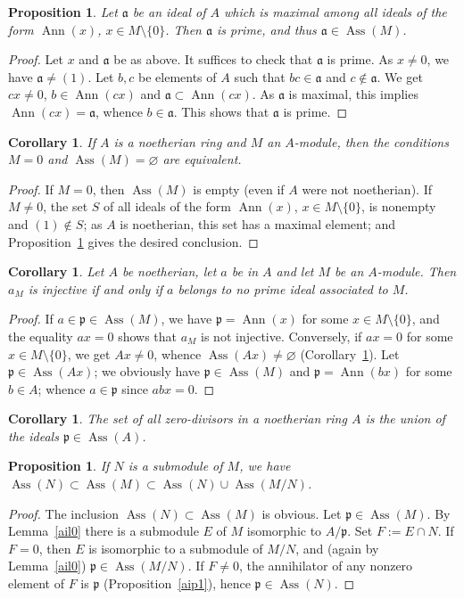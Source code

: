 \documentclass[12pt,letterpaper]{article}%
\newcommand{\oo}{\operatorname}\newcommand{\ooo}{\operatorname*}
\newcommand{\mf}{\mathfrak}
\newcommand{\aaa}{\mf a}
\newcommand{\ppp}{\mf p}
\newcommand{\Ann}{\oo{Ann}}
\newcommand{\Ass}{\oo{Ass}}
\newtheorem{cor}[thm]{Corollary}
\newtheorem{prop}[thm]{Proposition}
\begin{document}
\begin{prop}\label{aip2}
Let $\aaa$ be an ideal of $A$ which is maximal among all ideals of the form $\Ann(x)$, $x\in M\setminus\{0\}$. Then $\aaa$ is prime, and thus $\aaa\in\Ass(M)$.
\end{prop}
\begin{proof}
Let $x$ and $\aaa$ be as above. It suffices to check that $\aaa$ is prime. As $x\ne0$, we have $\aaa\ne(1)$. Let $b,c$ be elements of $A$ such that $bc\in\aaa$ and $c\notin\aaa$. We get $cx\ne0$, $b\in\Ann(cx)$ and $\aaa\subset\Ann(cx)$. As $\aaa$ is maximal, this implies $\Ann(cx)=\aaa$, whence $b\in\aaa$. This shows that $\aaa$ is prime.
\end{proof}
\begin{cor}\label{iac1}
If $A$ is a noetherian ring and $M$ an $A$-module, then the conditions $M=0$ and $\Ass(M)=\varnothing$ are equivalent.
\end{cor}
\begin{proof}
If $M=0$, then $\Ass(M)$ is empty (even if $A$ were not noetherian). If $M\ne0$, the set $S$ of all ideals of the form $\Ann(x)$, $x\in M\setminus\{0\}$, is nonempty and $(1)\notin S$; as $A$ is noetherian, this set has a maximal element; and Proposition~\ref{aip2} gives the desired conclusion.
\end{proof}
\begin{cor} Let $A$ be noetherian, let $a$ be in $A$ and let $M$ be an $A$-module. Then $a_M$ is injective if and only if $a$ belongs to no prime ideal associated to $M$.
\end{cor}
\begin{proof}
If $a\in\ppp\in\Ass(M)$, we have $\ppp=\Ann(x)$ for some $x\in M\setminus\{0\}$, and the equality $ax=0$ shows that $a_M$ is not injective. Conversely, if $ax=0$ for some $x\in M\setminus\{0\}$, we get $Ax\ne0$, whence $\Ass(Ax)\ne\varnothing$ (Corollary~\ref{iac1}). Let $\ppp\in\Ass(Ax)$; we obviously have $\ppp\in\Ass(M)$ and $\ppp=\Ann(bx)$ for some $b\in A$; whence $a\in\ppp$ since $abx=0$. 
\end{proof}
\begin{cor}
The set of all zero-divisors in a noetherian ring $A$ is the union of the ideals $\ppp\in\Ass(A)$.
\end{cor}
\begin{prop}\label{aip3}
If $N$ is a submodule of $M$, we have $\Ass(N)\subset\Ass(M)\subset\Ass(N)\cup\Ass(M/N)$.
\end{prop}
\begin{proof}
The inclusion $\Ass(N)\subset\Ass(M)$ is obvious. Let $\ppp\in\Ass(M)$. By Lemma~\ref{ail0} there is a submodule $E$ of $M$ isomorphic to $A/\ppp$. Set $F:=E\cap N$. If $F=0$, then $E$ is isomorphic to a submodule of $M/N$, and (again by Lemma~\ref{ail0}) $\ppp\in\Ass(M/N)$. If $F\ne0$, the annihilator of any nonzero element of $F$ is $\ppp$ (Proposition~\ref{aip1}), hence $\ppp\in\Ass(N)$.
\end{proof}
\end{document}

